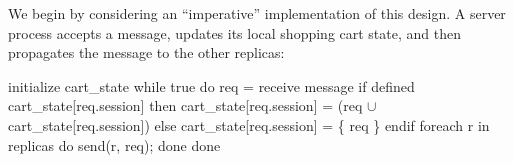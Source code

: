 We begin by considering an ``imperative''  implementation of this design. A
server process accepts a message, updates its local shopping cart state, and
then propagates the message to the other replicas:






\begin{Dedalus}
initialize cart_state
while true do
  req = receive message
  if defined cart_state[req.session] then
     cart_state[req.session] =  
       (req \(\cup\) cart_state[req.session]) 
  else 
    cart_state[req.session] = \{ req \} 
  endif
  foreach r in replicas do
    send(r, req);
  done
done
\end{Dedalus}

